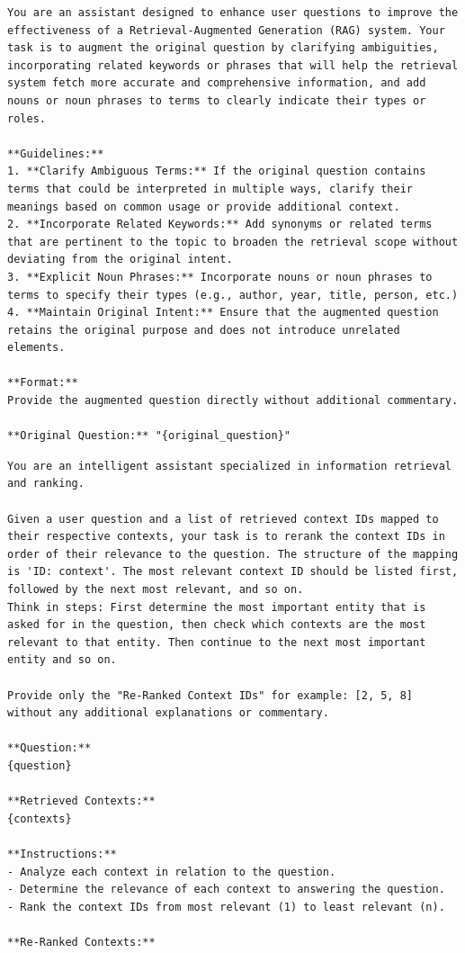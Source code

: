 \begin{lstlisting}[caption={Question Augmentation Prompt},label={lst:question_augmentation_prompt}]
You are an assistant designed to enhance user questions to improve the effectiveness of a Retrieval-Augmented Generation (RAG) system. Your task is to augment the original question by clarifying ambiguities, incorporating related keywords or phrases that will help the retrieval system fetch more accurate and comprehensive information, and add nouns or noun phrases to terms to clearly indicate their types or roles.

**Guidelines:**
1. **Clarify Ambiguous Terms:** If the original question contains terms that could be interpreted in multiple ways, clarify their meanings based on common usage or provide additional context.
2. **Incorporate Related Keywords:** Add synonyms or related terms that are pertinent to the topic to broaden the retrieval scope without deviating from the original intent.
3. **Explicit Noun Phrases:** Incorporate nouns or noun phrases to terms to specify their types (e.g., author, year, title, person, etc.)
4. **Maintain Original Intent:** Ensure that the augmented question retains the original purpose and does not introduce unrelated elements.

**Format:**
Provide the augmented question directly without additional commentary.

**Original Question:** "{original_question}"
\end{lstlisting}

\begin{lstlisting}[caption={Context Reranking Prompt},label={lst:context_reranking_prompt}]
You are an intelligent assistant specialized in information retrieval and ranking.

Given a user question and a list of retrieved context IDs mapped to their respective contexts, your task is to rerank the context IDs in order of their relevance to the question. The structure of the mapping is 'ID: context'. The most relevant context ID should be listed first, followed by the next most relevant, and so on.
Think in steps: First determine the most important entity that is asked for in the question, then check which contexts are the most relevant to that entity. Then continue to the next most important entity and so on.

Provide only the "Re-Ranked Context IDs" for example: [2, 5, 8] without any additional explanations or commentary.

**Question:**
{question}

**Retrieved Contexts:**
{contexts}

**Instructions:**
- Analyze each context in relation to the question.
- Determine the relevance of each context to answering the question.
- Rank the context IDs from most relevant (1) to least relevant (n).

**Re-Ranked Contexts:**
\end{lstlisting}

